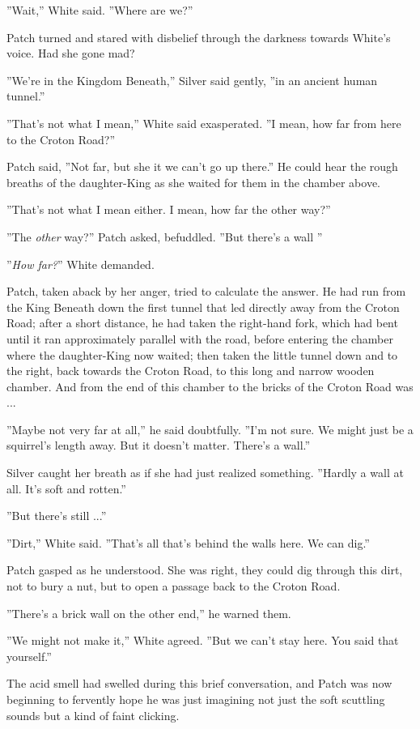 \documentclass[12pt]{book}
\begin{document}
''Wait,'' White said. ''Where are we?''

Patch turned and stared with disbelief through the darkness towards White's voice. Had she gone mad?

''We're in the Kingdom Beneath,'' Silver said gently, ''in an ancient human tunnel.''

''That's not what I mean,'' White said exasperated. ''I mean, how far from here to the Croton Road?''

Patch said, ''Not far, but she %
it %
we can't go up there.'' He could hear the rough breaths of the daughter-King as she waited for them in the chamber above.

''That's not what I mean either. I mean, how far the other way?''

''The {\it other} way?'' Patch asked, befuddled. ''But there's a wall %
''

''{\it How far?}'' White demanded.

Patch, taken aback by her anger, tried to calculate the answer. He had run from the King Beneath down the first tunnel that led directly away from the Croton Road; after a short distance, he had taken the right-hand fork, which had bent until it ran approximately parallel with the road, before entering the chamber where the daughter-King now waited; then taken the little tunnel down and to the right, back towards the Croton Road, to this long and narrow wooden chamber. And from the end of this chamber to the bricks of the Croton Road was ...

''Maybe not very far at all,'' he said doubtfully. ''I'm not sure. We might just be a squirrel's length away. But it doesn't matter. There's a wall.''

Silver caught her breath as if she had just realized something. ''Hardly a wall at all. It's soft and rotten.''

''But there's still ...''

''Dirt,'' White said. ''That's all that's behind the walls here. We can dig.''

Patch gasped as he understood. She was right, they could dig through this dirt, not to bury a nut, but to open a passage back to the Croton Road.

''There's a brick wall on the other end,'' he warned them.

''We might not make it,'' White agreed. ''But we can't stay here. You said that yourself.''

The acid smell had swelled during this brief conversation, and Patch was now beginning to fervently hope he was just imagining not just the soft scuttling sounds but a kind of faint clicking.
\end{document}
